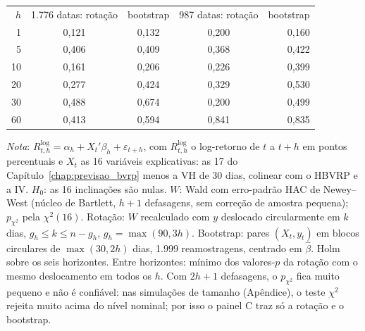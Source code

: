 \begin{table}[H]
\begin{tabular}{rrrrrrrr}
$h$ & \multicolumn{2}{c}{1.776 datas: rotação} & \multicolumn{2}{c}{bootstrap} & \multicolumn{2}{c}{987 datas: rotação} & bootstrap \\
1 & \multicolumn{2}{c}{0{,}121} & \multicolumn{2}{c}{0{,}132} & \multicolumn{2}{c}{0{,}200} & 0{,}160 \\
5 & \multicolumn{2}{c}{0{,}406} & \multicolumn{2}{c}{0{,}409} & \multicolumn{2}{c}{0{,}368} & 0{,}422 \\
10 & \multicolumn{2}{c}{0{,}161} & \multicolumn{2}{c}{0{,}206} & \multicolumn{2}{c}{0{,}226} & 0{,}399 \\
20 & \multicolumn{2}{c}{0{,}277} & \multicolumn{2}{c}{0{,}424} & \multicolumn{2}{c}{0{,}329} & 0{,}530 \\
30 & \multicolumn{2}{c}{0{,}488} & \multicolumn{2}{c}{0{,}674} & \multicolumn{2}{c}{0{,}200} & 0{,}499 \\
60 & \multicolumn{2}{c}{0{,}413} & \multicolumn{2}{c}{0{,}594} & \multicolumn{2}{c}{0{,}841} & 0{,}835 \\
\bottomrule
\end{tabular}
\par\smallskip
\parbox{0.95\linewidth}{\footnotesize\textit{Nota}: $R^{\log}_{t,h} = \alpha_h + X_t'\beta_h + \varepsilon_{t+h}$, com $R^{\log}_{t,h}$ o log-retorno de $t$ a $t+h$ em pontos percentuais e $X_t$ as 16 variáveis explicativas: as 17 do Capítulo~\ref{chap:previsao_bvrp} menos a VH de 30 dias, colinear com o HBVRP e a IV. $H_0$: as 16 inclinações são nulas. $W$: Wald com erro-padrão HAC de Newey--West (núcleo de Bartlett, $h+1$ defasagens, sem correção de amostra pequena); $p_{\chi^2}$ pela $\chi^2(16)$. Rotação: $W$ recalculado com $y$ deslocado circularmente em $k$ dias, $g_h \le k \le n - g_h$, $g_h = \max(90, 3h)$. Bootstrap: pares $(X_t, y_t)$ em blocos circulares de $\max(30, 2h)$ dias, 1.999 reamostragens, centrado em $\hat\beta$. Holm sobre os seis horizontes. Entre horizontes: mínimo dos valores-$p$ da rotação com o mesmo deslocamento em todos os $h$. Com $2h+1$ defasagens, o $p_{\chi^2}$ fica muito pequeno e não é confiável: nas simulações de tamanho (Apêndice), o teste $\chi^2$ rejeita muito acima do nível nominal; por isso o painel C traz só a rotação e o bootstrap.}
\end{table}
